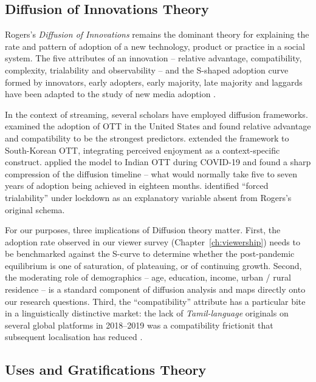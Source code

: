 \subsection{Diffusion of Innovations Theory}
\label{sec:doi}

Rogers's \citeyearpar{rogers2003} \emph{Diffusion of Innovations}
remains the dominant theory for explaining the rate and pattern of
adoption of a new technology, product or practice in a social system.
The five attributes of an innovation -- relative advantage,
compatibility, complexity, trialability and observability -- and the
S-shaped adoption curve formed by innovators, early adopters, early
majority, late majority and laggards have been adapted to the study
of new media adoption \citep{lin2003,vishwanath2005,straub2009}.

In the context of streaming, several scholars have employed
diffusion frameworks.  \citet{cha2013} examined the adoption of OTT
in the United States and found relative advantage and compatibility
to be the strongest predictors.  \citet{shin2018} extended the
framework to South-Korean OTT, integrating perceived enjoyment as a
context-specific construct.  \citet{shukla2022} applied the model to
Indian OTT during COVID-19 and found a sharp compression of the
diffusion timeline -- what would normally take five to seven years
of adoption being achieved in eighteen months.  \citet{jaiswal2022}
identified ``forced trialability'' under lockdown as an explanatory
variable absent from Rogers's original schema.

For our purposes, three implications of Diffusion theory matter.
First, the adoption rate observed in our viewer survey
(Chapter~\ref{ch:viewership}) needs to be benchmarked against the
S-curve to determine whether the post-pandemic equilibrium is one of
saturation, of plateauing, or of continuing growth.  Second, the
moderating role of demographics -- age, education, income, urban /
rural residence -- is a standard component of diffusion analysis and
maps directly onto our research questions.  Third, the
``compatibility'' attribute has a particular bite in a linguistically
distinctive market: the lack of \emph{Tamil-language} originals on
several global platforms in 2018--2019 was a compatibility frictionit
that subsequent localisation has reduced \citep{punathambekar2013,
mehta2020streaming}.

\subsection{Uses and Gratifications Theory}
\label{sec:ug}

